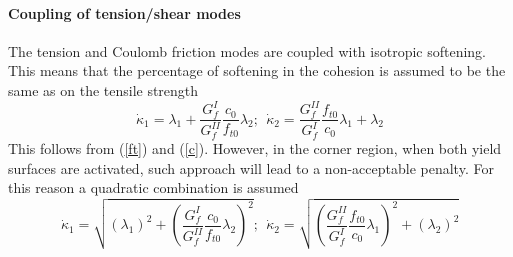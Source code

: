 \documentclass[epsf,a4paper]{article}
\newcommand{\del}[2]{\mbox{$\displaystyle\frac{#1}{#2}$}}
\begin{document}
\paragraph{Coupling of tension/shear modes}
The tension and Coulomb friction modes are coupled with isotropic softening. This means that the percentage of softening in the cohesion is assumed to be the same as on the tensile strength
\begin{equation}
  \dot\kappa_1=\lambda_1+\del{G^I_f}{G^{II}_f}\del{c_0}{f_{t0}}\lambda_2;\ \ \dot\kappa_2=\del{G^{II}_f}{G^I_f}\del{f_{t0}}{c_0}\lambda_1+\lambda_2
\end{equation}
This follows from (\ref{ft}) and (\ref{c}). However, in the corner region, when both yield surfaces are activated, such approach will lead to a non-acceptable penalty. For this reason a quadratic combination is assumed 
\begin{equation}
  \dot\kappa_1=\sqrt{(\lambda_1)^2+\left(\del{G^I_f}{G^{II}_f}\del{c_0}{f_{t0}}\lambda_2\right)^2};\ \ \dot\kappa_2=\sqrt{\left(\del{G^{II}_f}{G^I_f}\del{f_{t0}}{c_0}\lambda_1\right)^2+(\lambda_2)^2}
\end{equation}
\end{document}
